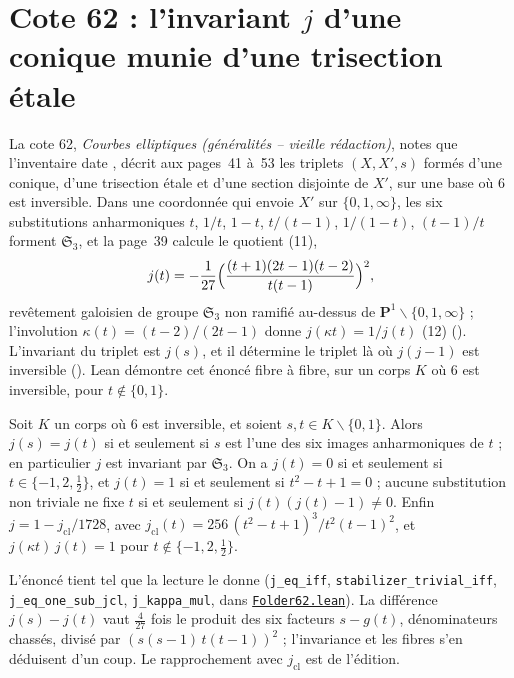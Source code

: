 \section[Cote 62 : l'invariant $j$ d'une conique munie d'une trisection étale]{Cote 62 : l'invariant $j$ d'une conique munie d'une trisection étale\protect{}}\label{sec:62}

La cote 62, \emph{Courbes elliptiques (généralités -- vieille rédaction)}, notes que l'inventaire date \q{[à partir de 1963]}, décrit aux pages~41 à~53 les triplets $(X, X', s)$ formés d'une conique, d'une trisection étale et d'une section disjointe de $X'$, sur une base où $6$ est inversible. Dans une coordonnée qui envoie $X'$ sur $\{0, 1, \infty\}$, les six substitutions anharmoniques $t$, $1/t$, $1 - t$, $t/(t-1)$, $1/(1-t)$, $(t-1)/t$ forment $\mathfrak S_3$, et la page~39 calcule le quotient (11),
\[
  j(t) = -\frac{1}{27}\Bigl(\frac{(t+1)(2t-1)(t-2)}{t(t-1)}\Bigr)^2 ,
\]
revêtement galoisien de groupe $\mathfrak S_3$ non ramifié au-dessus de $\mathbf P^1 \smallsetminus \{0, 1, \infty\}$ ; l'involution $\kappa(t) = (t-2)/(2t-1)$ donne $j(\kappa t) = 1/j(t)$ (12) (). L'invariant du triplet est $j(s)$, et il détermine le triplet là où $j(j-1)$ est inversible (). Lean démontre cet énoncé fibre à fibre, sur un corps $K$ où $6$ est inversible, pour $t \notin \{0, 1\}$.

\begin{encadre}
\begin{theoreme}\label{thm:62-j}
Soit $K$ un corps où $6$ est inversible, et soient $s, t \in K \smallsetminus \{0, 1\}$. Alors $j(s) = j(t)$ si et seulement si $s$ est l'une des six images anharmoniques de $t$ ; en particulier $j$ est invariant par $\mathfrak S_3$. On a $j(t) = 0$ si et seulement si $t \in \{-1, 2, \frac12\}$, et $j(t) = 1$ si et seulement si $t^2 - t + 1 = 0$ ; aucune substitution non triviale ne fixe $t$ si et seulement si $j(t)(j(t) - 1) \neq 0$. Enfin $j = 1 - j_{\mathrm{cl}}/1728$, avec $j_{\mathrm{cl}}(t) = 256\,(t^2 - t + 1)^3/t^2(t-1)^2$, et $j(\kappa t)\,j(t) = 1$ pour $t \notin \{-1, 2, \frac12\}$.
\end{theoreme}
\end{encadre}

\begin{sloppypar}
\noindent L'énoncé tient tel que la lecture le donne (\texttt{j\_eq\_iff}, \texttt{stabilizer\_trivial\_iff}, \texttt{j\_eq\_one\_sub\_jcl}, \texttt{j\_kappa\_mul}, dans \href{\leanblob/AlgebraicGeometry/Folder62.lean}{\texttt{Folder62.\allowbreak{}lean}}). La différence $j(s) - j(t)$ vaut $\frac{4}{27}$ fois le produit des six facteurs $s - g(t)$, dénominateurs chassés, divisé par $(s(s-1)\,t(t-1))^2$ ; l'invariance et les fibres s'en déduisent d'un coup. Le rapprochement avec $j_{\mathrm{cl}}$ est de l'édition.
\end{sloppypar}

